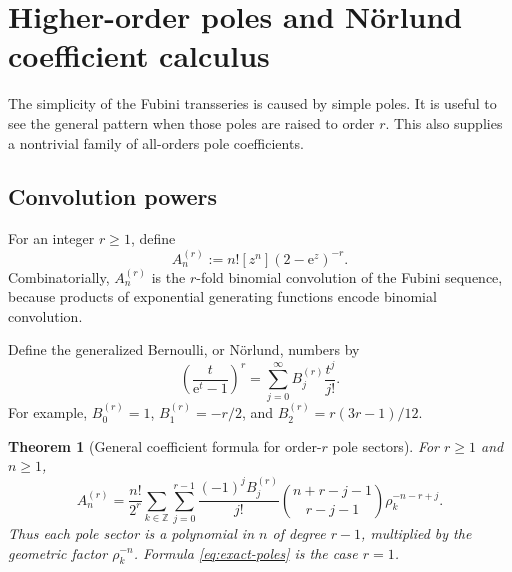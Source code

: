 \documentclass[11pt,a4paper]{article}
\newtheorem{theorem}{Theorem}[section]
\theoremstyle{definition}
\theoremstyle{remark}
\newcommand{\e}{\mathrm e}
\newcommand{\coeff}[2]{\left[#1^{#2}\right]}
\newcommand{\Z}{\mathbb Z}
\begin{document}
\section{Higher-order poles and N\"orlund coefficient calculus}

The simplicity of the Fubini transseries is caused by simple poles.  It is
useful to see the general pattern when those poles are raised to order \(r\).
This also supplies a nontrivial family of all-orders pole coefficients.

\subsection{Convolution powers}

For an integer \(r\ge1\), define
\begin{equation}\label{eq:conv-power}
 A_n^{(r)}:=n!\coeff{z}{n}(2-\e^z)^{-r}.
\end{equation}
Combinatorially, \(A_n^{(r)}\) is the \(r\)-fold binomial convolution of the
Fubini sequence, because products of exponential generating functions encode
binomial convolution.

Define the generalized Bernoulli, or N\"orlund, numbers by
\begin{equation}\label{eq:norlund}
 \left(\frac{t}{\e^t-1}\right)^r
 =\sum_{j=0}^{\infty}B_j^{(r)}\frac{t^j}{j!}.
\end{equation}
For example,
\(
 B_0^{(r)}=1
\),
\(
 B_1^{(r)}=-r/2
\), and
\(
 B_2^{(r)}=r(3r-1)/12
\).

\begin{theorem}[General coefficient formula for order-\(r\) pole sectors]
\label{thm:higher-poles}
For \(r\ge1\) and \(n\ge1\),
\begin{equation}\label{eq:higher-pole-formula}
 \boxed{\displaystyle
 A_n^{(r)}=
 \frac{n!}{2^r}\sum_{k\in\Z}\sum_{j=0}^{r-1}
 \frac{(-1)^jB_j^{(r)}}{j!}
 \binom{n+r-j-1}{r-j-1}
 \rho_k^{-n-r+j}.}
\end{equation}
Thus each pole sector is a polynomial in \(n\) of degree \(r-1\), multiplied
by the geometric factor \(\rho_k^{-n}\).  Formula \eqref{eq:exact-poles} is the
case \(r=1\).
\end{theorem}
\end{document}
